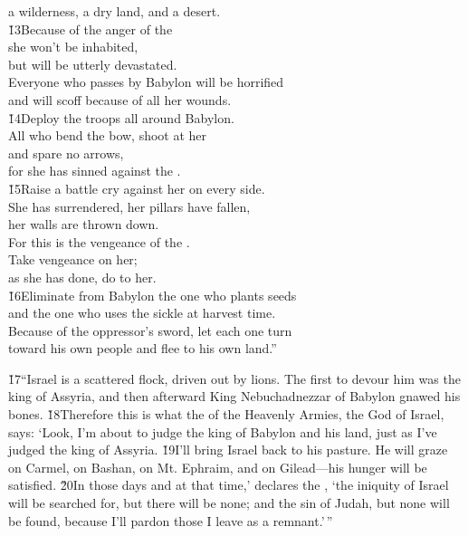 \begin{poetry}
\poemll    a wilderness, a dry land, and a desert. \\
\poeml \v{13}Because of the anger of the  \\
\poemll    she won't be inhabited, \\
\poemll    but will be utterly devastated. \\
\poeml Everyone who passes by Babylon will be horrified \\
\poemll    and will scoff because of all her wounds. \\
\poeml \v{14}Deploy the troops all around Babylon. \\
\poemll    All who bend the bow, shoot at her \\
\poeml and spare no arrows, \\
\poemll    for she has sinned against the . \\
\poeml \v{15}Raise a battle cry against her on every side. \\
\poemll    She has surrendered, her pillars have fallen, \\
\poemlll       her walls are thrown down. \\
\poeml For this is the vengeance of the . \\
\poemll    Take vengeance on her; \\
\poemlll       as she has done, do to her. \\
\poeml \v{16}Eliminate from Babylon the one who plants seeds \\
\poemll    and the one who uses the sickle at harvest time. \\
\poeml Because of the oppressor's sword, let each one turn \\
\poemll    toward his own people and flee to his own land.''
\end{poetry}

\v{17}``Israel is a scattered flock, driven out by lions. The first to devour him was the king of Assyria, and then afterward King Nebuchadnezzar of Babylon gnawed his bones. \v{18}Therefore this is what the  of the Heavenly Armies, the God of Israel, says: `Look, I'm about to judge the king of Babylon and his land, just as I've judged the king of Assyria. \v{19}I'll bring Israel back to his pasture. He will graze on Carmel, on Bashan, on Mt. Ephraim, and on Gilead---his hunger will be satisfied. \v{20}In those days and at that time,' declares the , `the iniquity of Israel will be searched for, but there will be none; and the sin of Judah, but none will be found, because I'll pardon those I leave as a remnant.'\,''

